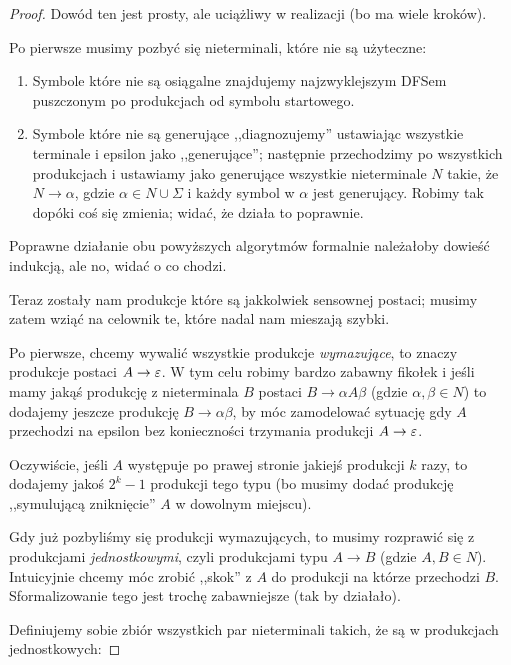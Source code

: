 \begin{proof}
    Dowód ten jest prosty, ale uciążliwy w realizacji (bo ma wiele kroków). 
    
    Po pierwsze musimy pozbyć się nieterminali, które nie są użyteczne: 
    
    \begin{enumerate}
        \item Symbole które nie są osiągalne znajdujemy najzwyklejszym DFSem puszczonym po produkcjach od symbolu startowego.
        \item Symbole które nie są generujące ,,diagnozujemy'' ustawiając wszystkie terminale i epsilon jako ,,generujące''; następnie przechodzimy po wszystkich produkcjach i ustawiamy jako generujące wszystkie nieterminale \(N\) takie, że \( N \rightarrow \alpha \), gdzie \( \alpha \in N \cup \Sigma \) i każdy symbol w \(\alpha\) jest generujący. Robimy tak dopóki coś się zmienia; widać, że działa to poprawnie.
    \end{enumerate}
    
   Poprawne działanie obu powyższych algorytmów formalnie należałoby dowieść indukcją, ale no, widać o co chodzi. 
   
   Teraz zostały nam produkcje które są jakkolwiek sensownej postaci; musimy zatem wziąć na celownik te, które nadal nam mieszają szybki.
   
   Po pierwsze, chcemy wywalić wszystkie produkcje \textit{wymazujące}, to znaczy produkcje postaci \( A \rightarrow \varepsilon \). W tym celu robimy bardzo zabawny fikołek i jeśli mamy jakąś produkcję z nieterminala \(B\) postaci \(B \rightarrow \alpha A \beta\) (gdzie \(  \alpha, \beta \in N \)) to dodajemy jeszcze produkcję \(B \rightarrow \alpha \beta\), by móc zamodelować sytuację gdy \(A\) przechodzi na epsilon bez konieczności trzymania produkcji \( A \rightarrow \varepsilon\). 
   
   Oczywiście, jeśli \(A\) występuje po prawej stronie jakiejś produkcji \(k\) razy, to dodajemy jakoś \(2^k-1\) produkcji tego typu (bo musimy dodać produkcję ,,symulującą zniknięcie'' \(A\) w dowolnym miejscu). 
   
   Gdy już pozbyliśmy się produkcji wymazujących, to musimy rozprawić się z produkcjami \textit{jednostkowymi}, czyli produkcjami typu \(A \rightarrow B\) (gdzie \(A, B \in N\)). Intuicyjnie chcemy móc zrobić ,,skok'' z \(A\) do produkcji na którze przechodzi \(B\). Sformalizowanie tego jest trochę zabawniejsze (tak by działało). 
   
   Definiujemy sobie zbiór wszystkich par nieterminali takich, że są w produkcjach jednostkowych: 
   

\end{proof}
